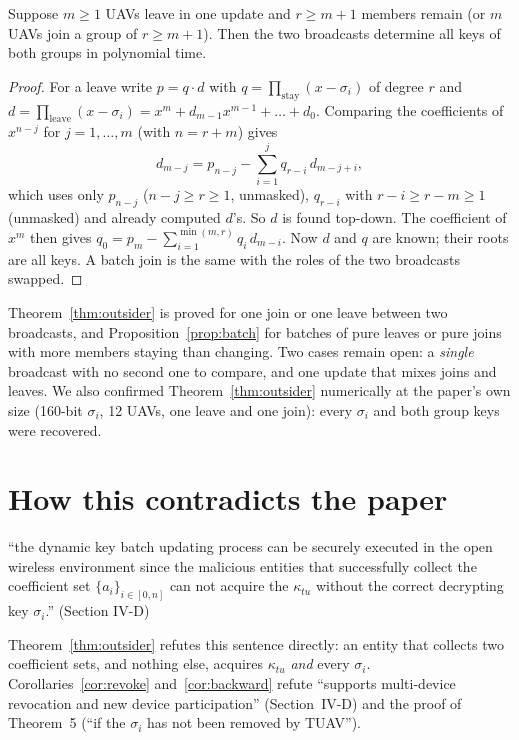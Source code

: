 \begin{proposition}\label{prop:batch}
Suppose $m\ge1$ UAVs leave in one update and $r\ge m+1$ members remain (or $m$ UAVs join a group of $r\ge m+1$). Then the two broadcasts determine all
keys of both groups in polynomial time.
\end{proposition}
\begin{proof}
For a leave write $p=q\cdot d$ with $q=\prod_{\text{stay}}(x-\sigma_i)$ of degree $r$ and $d=\prod_{\text{leave}}(x-\sigma_i)=x^m+d_{m-1}x^{m-1}+\dots+d_0$.
Comparing the coefficients of $x^{n-j}$ for $j=1,\dots,m$ (with $n=r+m$) gives
\[
d_{m-j}=p_{n-j}-\sum_{i=1}^{j}q_{r-i}\,d_{m-j+i},
\]
which uses only $p_{n-j}$ ($n-j\ge r\ge1$, unmasked), $q_{r-i}$ with $r-i\ge r-m\ge1$ (unmasked) and already computed $d$'s. So $d$ is found top-down.
The coefficient of $x^m$ then gives $q_0=p_m-\sum_{i=1}^{\min(m,r)}q_i\,d_{m-i}$. Now $d$ and $q$ are known; their roots are all keys. A batch join is the
same with the roles of the two broadcasts swapped.
\end{proof}


\begin{remark}[Scope]
Theorem~\ref{thm:outsider} is proved for one join or one leave between two broadcasts, and Proposition~\ref{prop:batch} for batches of pure leaves or pure
joins with more members staying than changing. Two cases remain open: a \emph{single} broadcast with no
second one to compare, and one update that mixes joins and leaves. We also confirmed Theorem~\ref{thm:outsider} numerically at the paper's own size
(160-bit $\sigma_i$, 12 UAVs, one leave and one join): every $\sigma_i$ and both group keys were recovered.
\end{remark}

\section{How this contradicts the paper}
\begin{claimbox}
``the dynamic key batch updating process can be securely executed in the open wireless environment since the malicious entities that successfully
collect the coefficient set $\{a_i\}_{i\in[0,n]}$ can not acquire the $\kappa_{tu}$ without the correct decrypting key $\sigma_i$.'' \hfill (Section IV-D)
\end{claimbox}
Theorem~\ref{thm:outsider} refutes this sentence directly: an entity that collects two coefficient sets, and nothing else, acquires $\kappa_{tu}$
\emph{and} every $\sigma_i$. Corollaries~\ref{cor:revoke} and~\ref{cor:backward} refute ``supports multi-device revocation and new device participation''
(Section~IV-D) and the proof of Theorem~5 (``if the $\sigma_i$ has not been removed by TUAV'').

